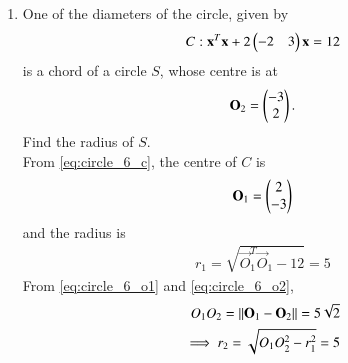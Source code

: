 \documentclass[journal,12pt,twocolumn]{IEEEtran}
\begin{document}
\begin{enumerate}[label=\arabic*]
%
%
\item One of the diameters of the circle, given by 
\begin{equation}
C: \mathbf{x}^T\mathbf{x} +2\begin{pmatrix}-2 & 3 \end{pmatrix}\mathbf{x} = 12
\label{eq:circle_6_c}
\end{equation}
is a chord of a circle $S$, whose centre is at 
\begin{equation}
\mathbf{O}_2=\begin{pmatrix}-3\\ 2\end{pmatrix}.
\label{eq:circle_6_o2}
\end{equation}
Find the radius of $S$.
\\
\solution From \eqref{eq:circle_6_c}, the centre of $C$ is 
\begin{align}
\mathbf{O}_1 = \begin{pmatrix}2\\ -3\end{pmatrix} 
\label{eq:circle_6_o1}
\end{align}
%
and the radius is 
\begin{align}
r_1 = \sqrt{\vec{O}_1^T\vec{O}_1-12} = 5
\label{eq:circle_6_r1}
\end{align}
%
From \eqref{eq:circle_6_o1} and \eqref{eq:circle_6_o2},
\begin{align}
O_1O_2 = \left\Vert\mathbf{O}_1-\mathbf{O}_2\right\Vert=5\sqrt{2}
\nonumber \\
\label{eq:circle_6_o1o2}
\implies r_2 = \sqrt{O_1O_2^2-r_1^2} = 5
\end{align}


\end{enumerate}
\end{document}
